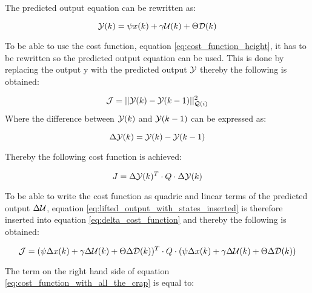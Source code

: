 The predicted output equation can be rewritten as: 

\begin{equation}\label{eq:lifted_output_with_states_inserted}
	\CMcal{Y}(k) = \psi x(k) + \gamma \CMcal{U}(k) + \Theta \CMcal{D}(k)
\end{equation}

To be able to use the cost function, equation \ref{eq:cost_function_height}, it has to be rewritten so the predicted output equation can be used. This is done by replacing the output y with the predicted output $\CMcal{Y}$ thereby the following is obtained:

\begin{equation}
	\CMcal{J} = ||\CMcal{Y}(k)-\CMcal{Y}(k-1)||_{\CMcal{Q}(i)}^2
\end{equation}
Where the difference between $\CMcal{Y}(k)$ and $\CMcal{Y}(k-1)$ can be expressed as:

\begin{equation}
	\Delta \CMcal{Y}(k) =\CMcal{Y}(k)-\CMcal{Y}(k-1) 
\end{equation}

Thereby the following cost function is achieved:

\begin{equation}\label{eq:delta_cost_function}
	J = \Delta\CMcal{Y}(k)^T \cdot Q \cdot \Delta\CMcal{Y}(k)
\end{equation}

To be able to write the cost function as quadric and linear terms of the predicted output $\Delta\CMcal{U}$, equation \ref{eq:lifted_output_with_states_inserted} is therefore inserted into equation \ref{eq:delta_cost_function} and thereby the following is obtained:

\begin{equation}\label{eq:cost_function_with_all_the_crap}
	\CMcal{J} = (\psi\Delta x(k) + \gamma\Delta \CMcal{U}(k) + \Theta\Delta \CMcal{D}(k))^T\cdot Q \cdot (\psi\Delta x(k) + \gamma\Delta \CMcal{U}(k) + \Theta\Delta \CMcal{D}(k))
\end{equation}

The term on the right hand side of equation \ref{eq:cost_function_with_all_the_crap} is equal to:

